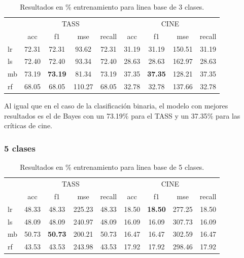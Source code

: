 \begin{table}[H]
	\centering
	\begin{tabular}{|l|cccc|cccc|}
		\hline
		& \multicolumn{4}{c|}{TASS} & \multicolumn{4}{c|}{CINE} \\
		\cline{2-9}
		&    acc &     f1 &    mse &  recall & acc &     f1 &    mse &  recall \\
		\hline
		lr      &  72.31 &  72.31 &   93.62 &   72.31 &  31.19 &  31.19 &  150.51 &   31.19 \\
		ls      &  72.40 &  72.40 &   93.34 &   72.40 &  28.63 &  28.63 &  162.97 &   28.63 \\
		mb      &  73.19 &  \textbf{73.19} &   81.34 &   73.19 &  37.35 &  \textbf{37.35} &  128.21 &   37.35 \\
		rf      &  68.05 &  68.05 &  110.27 &   68.05 &  32.78 &  32.78 &  137.66 &   32.78 \\
		\hline
	\end{tabular}
	\caption{Resultados en \% entrenamiento para linea base de 3 clases.}
	\label{result-linea-base-3-clases}
\end{table}

Al igual que en el caso de la clasificación binaria, el modelo con mejores resultados es el de Bayes con un 73.19\% para el TASS y un 37.35\% para las críticas de cine.

\subsubsection{5 clases}

\begin{table}[H]
	\centering
	\begin{tabular}{|l|cccc|cccc|}
		\hline
		& \multicolumn{4}{c|}{TASS} & \multicolumn{4}{c|}{CINE} \\
		\cline{2-9}
		&    acc &     f1 &    mse &  recall & acc &     f1 &    mse &  recall \\
		\hline
		lr      &  48.33 &  48.33 &  225.23 &   48.33 &  18.50 &  \textbf{18.50 }&  277.25 &   18.50 \\
		ls      &  48.09 &  48.09 &  240.97 &   48.09 &  16.09 &  16.09 &  307.73 &   16.09 \\
		mb      &  50.73 &  \textbf{50.73} &  200.21 &   50.73 &  16.47 &  16.47 &  302.59 &   16.47 \\
		rf      &  43.53 &  43.53 &  243.98 &   43.53 &  17.92 &  17.92 &  298.46 &   17.92 \\
		\hline
	\end{tabular}
	\caption{Resultados en \% entrenamiento para linea base de 5 clases.}
	\label{result-linea-base-5-clases}
\end{table}

